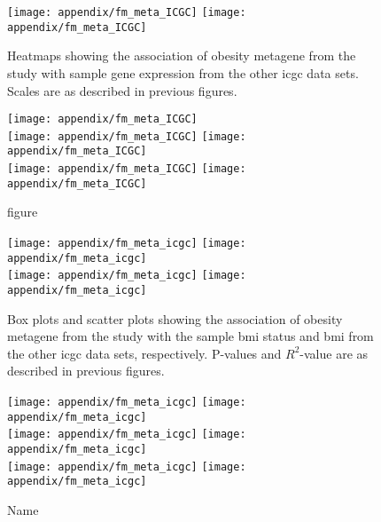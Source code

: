 \begin{appendices}
	\begin{figure}[htp!]
		\centering
		\texttt{[image: appendix/fm\_meta\_ICGC]}
		\vspace{1em}
		\texttt{[image: appendix/fm\_meta\_ICGC]}\\
		\hfill
		\caption{Heatmaps showing the association of obesity metagene from the \citet{Creighton2012} study with sample gene expression from the other \gls{icgc} data sets.
	Scales are as described in previous figures.}
		\label{fig:appendix/fm_icgc_heatmap}
	\end{figure}

	\begin{figure}[htpb]
		\ContinuedFloat
		\captionsetup{list=off,format=cont}
		\centering
		\texttt{[image: appendix/fm\_meta\_ICGC]}\\
		\vspace{1em}
		\texttt{[image: appendix/fm\_meta\_ICGC]}
		\hfill
		\texttt{[image: appendix/fm\_meta\_ICGC]}\\
		\vspace{1em}
		\texttt{[image: appendix/fm\_meta\_ICGC]}
		\hfill
		\texttt{[image: appendix/fm\_meta\_ICGC]}\\
		\vspace{1em}
		\caption{figure}
	\end{figure}

	\begin{figure}[htpb]
		\centering
		\texttt{[image: appendix/fm\_meta\_icgc]}
		\hfill
		\texttt{[image: appendix/fm\_meta\_icgc]}\\
		\texttt{[image: appendix/fm\_meta\_icgc]}
		\hfill
		\texttt{[image: appendix/fm\_meta\_icgc]}\\
		\caption{Box plots and scatter plots showing the association of obesity metagene from the \citet{Creighton2012} study with the sample \gls{bmi} status  and \gls{bmi} from the other \gls{icgc} data sets, respectively.
	P-values and $R^2$-value are as described in previous figures.}
		\label{fig:appendix/fm_icgc_box_scatter}
	\end{figure}

	\begin{figure}[htpb]
		\ContinuedFloat
		\captionsetup{list=off,format=cont}
		\centering
		\texttt{[image: appendix/fm\_meta\_icgc]}
		\hfill
		\texttt{[image: appendix/fm\_meta\_icgc]}\\
		\texttt{[image: appendix/fm\_meta\_icgc]}
		\hfill
		\texttt{[image: appendix/fm\_meta\_icgc]}\\
		\texttt{[image: appendix/fm\_meta\_icgc]}
		\hfill
		\texttt{[image: appendix/fm\_meta\_icgc]}\\
		\caption{Name}
	\end{figure}


\end{appendices}
